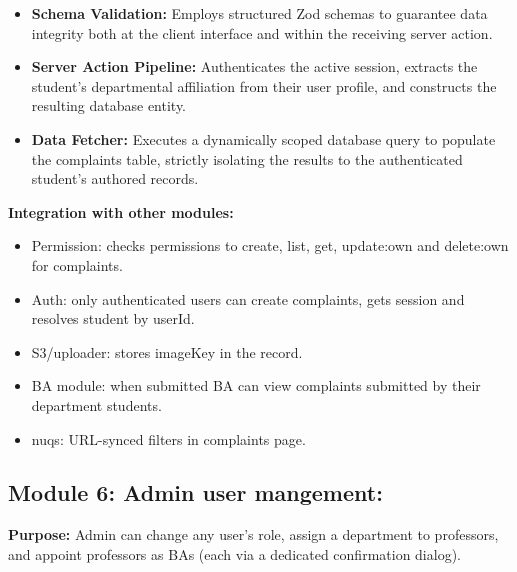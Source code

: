 \begin{itemize}
    \item \textbf{Schema Validation:} Employs structured Zod schemas to guarantee data integrity both at the client interface and within the receiving server action.
    \item \textbf{Server Action Pipeline:} Authenticates the active session, extracts the student's departmental affiliation from their user profile, and constructs the resulting database entity.
    \item \textbf{Data Fetcher:} Executes a dynamically scoped database query to populate the complaints table, strictly isolating the results to the authenticated student's authored records.
\end{itemize}

\textbf{Integration with other modules:}

\begin{itemize}
    \item Permission: checks permissions to create, list, get, update:own and delete:own for complaints.
    \item Auth: only authenticated users can create complaints, gets session and resolves student by userId.
    \item S3/uploader: stores imageKey in the record.
    \item BA module: when submitted BA can view complaints submitted by their department students.
    \item nuqs: URL-synced filters in complaints page.
\end{itemize}

\subsection{Module 6: Admin user mangement:}
\textbf{Purpose:}
Admin can change any user's role, assign a department to professors, and appoint professors as BAs (each via a dedicated confirmation dialog).

